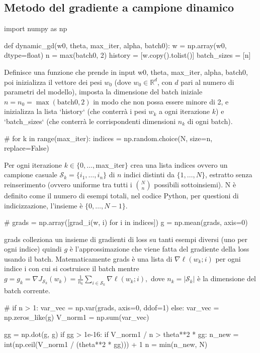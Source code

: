 \documentclass[a4paper,12pt]{article}
\numberwithin{equation}{section}
\numberwithin{figure}{section}
\numberwithin{table}{section}
\begin{document}
\subsection{Metodo del gradiente a campione dinamico}
\begin{pythoncode}[title= Dynamic GD]

import numpy as np

def dynamic_gd(w0, theta, max_iter, alpha, batch0):
    w = np.array(w0, dtype=float)
    n = max(batch0, 2)
    history     = [w.copy().tolist()]
    batch_sizes = [n]
\end{pythoncode}
Definisce una funzione che prende in input w0, theta, max\_iter, alpha, batch0, poi inizializza il vettore dei pesi $w_0$ (dove $w_0 \in \mathbb{R}^d$, con $d$ pari al numero di parametri del modello), imposta la dimensione del batch iniziale $n=n_0 = \max(\text{batch0}, 2)$ in modo che non possa essere minore di 2, e inizializza la lista `history` (che conterrà i pesi $w_k$ a ogni iterazione $k$) e `batch\_sizes` (che conterrà le corrispondenti dimensioni $n_k$ di ogni batch).
\begin{pythoncode}[title= Dynamic GD]

#
    for k in range(max_iter):
        indices = np.random.choice(N, size=n, replace=False)
\end{pythoncode}
Per ogni iterazione $k \in \{0,\dots,$max\_iter$\}$ crea una lista indices ovvero un campione casuale \(\mathcal{S}_k = \{i_1, \dots, i_n\}\) di \(n\) indici distinti da \(\{1,\dots,N\}\), estratto senza reinserimento (ovvero uniforme tra tutti i \(\binom{N}{n}\) possibili sottoinsiemi). N è definito come il numero di esempi totali, nel codice Python, per questioni di indicizzazione, l'insieme è \(\{0,\dots,N-1\}\).
\begin{pythoncode}[title= Dynamic GD]

#
        grads = np.array([grad_i(w, i) for i in indices])
        g = np.mean(grads, axis=0)
\end{pythoncode}
grads colleziona un insieme di gradienti di loss su tanti esempi diversi (uno per ogni indice) quindi $g$ è l'approssimazione che viene fatta del gradiente della loss usando il batch. Matematicamente grads è una lista di $\nabla \ell(w_k; i)$ per ogni indice i con cui si costruisce il batch mentre $g=g_k = \nabla J_{\mathcal{S}_k}(w_k) = \frac{1}{n_k} \sum_{i \in \mathcal{S}_k} \nabla \ell(w_k; i),$ dove \(n_k = |\mathcal{S}_k|\) è la dimensione del batch corrente.

\begin{pythoncode}[title= Dynamic GD]

#    
        if n > 1:
            var_vec = np.var(grads, axis=0, ddof=1)
        else:
            var_vec = np.zeros_like(g)
        V_norm1 = np.sum(var_vec)

        gg = np.dot(g, g)
        if gg > 1e-16:
            if V_norm1 / n > theta**2 * gg:
                n_new = int(np.ceil(V_norm1 / (theta**2 * gg))) + 1
                n = min(n_new, N)
\end{pythoncode}
\end{document}
